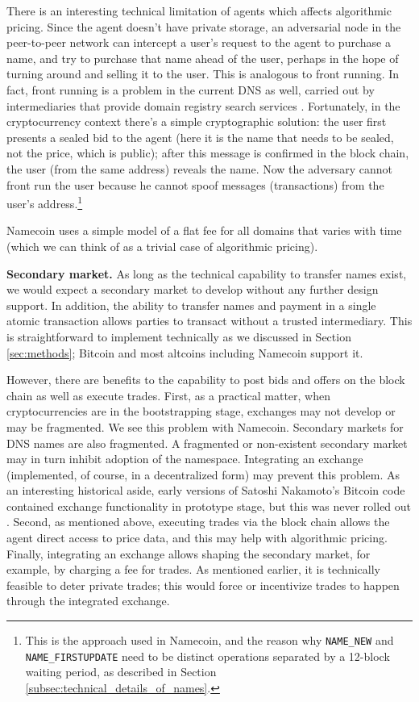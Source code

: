 There is an interesting technical limitation of agents which affects algorithmic pricing. Since the agent doesn't have private storage, an adversarial node in the peer-to-peer network can intercept a user's request to the agent to purchase a name, and try to purchase that name ahead of the user, perhaps in the hope of turning around and selling it to the user. This is analogous to front running. In fact, front running is a problem in the current DNS as well, carried out by intermediaries that provide domain registry search services \cite{frontrunning}. Fortunately, in the cryptocurrency context there's a simple cryptographic solution: the user first presents a sealed bid to the agent (here it is the name that needs to be sealed, not the price, which is public); after this message is confirmed in the block chain, the user (from the same address) reveals the name. Now the adversary cannot front run the user because he cannot spoof messages (transactions) from the user's address.\footnote{This is the approach used in Namecoin, and the reason why {\tt NAME\_NEW} and {\tt NAME\_FIRSTUPDATE} need to be distinct operations separated by a 12-block waiting period, as described in Section \ref{subsec:technical_details_of_names}.}


Namecoin uses a simple model of a flat fee for all domains that varies with time (which we can think of as a trivial case of algorithmic pricing).

{\bf Secondary market.} As long as the technical capability to transfer names exist, we would expect a secondary market to develop without any further design support. In addition, the ability to transfer names and payment in a single atomic transaction allows parties to transact without a trusted intermediary. This is straightforward to implement technically as we discussed in Section \ref{sec:methods}; Bitcoin and most altcoins including Namecoin support it. 

However, there are benefits to the capability to post bids and offers on the block chain as well as execute trades. First, as a practical matter, when cryptocurrencies are in the bootstrapping stage, exchanges may not develop or may be fragmented. We see this problem with Namecoin. Secondary markets for DNS names are also fragmented. A fragmented or non-existent secondary market may in turn inhibit adoption of the namespace. Integrating an exchange (implemented, of course, in a decentralized form) may prevent this problem. As an interesting historical aside, early versions of Satoshi Nakamoto's Bitcoin code contained exchange functionality in prototype stage, but this was never rolled out \cite{bitcoin}.  Second, as mentioned above, executing trades via the block chain allows the agent direct access to price data, and this may help with algorithmic pricing. Finally, integrating an exchange allows shaping the secondary market, for example, by charging a fee for trades. As mentioned earlier, it is technically feasible to deter private trades; this would force or incentivize trades to happen through the integrated exchange.


